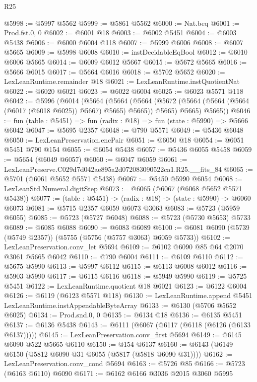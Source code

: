 \begin{lexlean}{R25}
\begin{coremodule}
@5998 := @5997 @5562
@5999 := @5861 @5562
@6000 := Nat.beq
@6001 := Prod.fst.{0, 0}
@6002 := @6001 @18
@6003 := @6002 @5451
@6004 := @6003 @5438
@6006 := @6000 @6004 @118
@6007 := @5999 @6006
@6008 := @6007 @5665
@6009 := @5998 @6008
@6010 := instDecidableEqBool
@6012 := @6010 @6006 @5665
@6014 := @6009 @6012 @5667
@6015 := @5672 @5665
@6016 := @5666 @6015
@6017 := @5664 @6016
@6018 := @5702 @5652
@6020 := LexLeanRuntime.remainder @18
@6021 := LexLeanRuntime.instQuotientNat
@6022 := @6020 @6021
@6023 := @6022 @6004
@6025 := @6023 @5571 @118
@6042 := @5996
    (@6014
      (@5664
        (@5664
          (@5664 (@5672 (@5664 (@5664 (@5664 (@6017 (@6018 @6025)) @5667) @5665) @5665)) @5665)
          @5665)
        @5665))
@6046 := fun (table : @5451) => fun (radix : @18) => fun (state : @5990) => @5666 @6042
@6047 := @5695 @2357
@6048 := @790 @5571
@6049 := @5436 @6048
@6050 := LexLeanPreservation.encPair
@6051 := @6050 @18
@6054 := @6051 @5451 @790 @154
@6055 := @6054 @5438
@6057 := @5436 @6055 @5458
@6059 := @5654 (@6049 @6057)
@6060 := @6047 @6059
@6061 := LexLeanPreserve.C029d7d042ae895a2d072083090522ca1.R25.__fits_84
@6065 := @5701 (@6061 @5652 @5571 @5438)
@6067 := @5450 @5990 @6054
@6068 := LexLeanStd.Numeral.digitStep
@6073 := @6065 (@6067 (@6068 @5652 @5571 @5438))
@6077 := (table : @5451) -> (radix : @18) -> (state : @5990) -> @6060 @6073
@6081 := @5715 @2357 @6059 @6073 @3063
@6083 := @5723 (@5959 @6055)
@6085 := @5723 (@5727 @6048)
@6088 := @5723 (@5730 @5653) @5733
@6089 := @6085 @6088
@6090 := @6083 @6089
@6100 := @6081 @6090 (@5739 (@5749 @2357)) (@5755 (@5756 (@5757 @3063) @6059 @5733))
@6102 := LexLeanPreservation.conv_let @5694
@6109 := @6102 @6090 @85 @64 @2070 @3061 @5665 @6042
@6110 := @790 @6004
@6111 := @6109 @6110
@6112 := @5675 @5990
@6113 := @5997 @6112
@6115 := @6113 @6008 @6012
@6116 := @5903 @5990
@6117 := @6115 @6116
@6118 := @5949 @5990
@6119 := @5725 @5451
@6122 := LexLeanRuntime.quotient @18 @6021
@6123 := @6122 @6004
@6126 := @6119 (@6123 @5571 @118)
@6130 := LexLeanRuntime.append @5451 LexLeanRuntime.instAppendableByteArray
@6133 := @6130 (@5706 @5652 @6025)
@6134 := Prod.snd.{0, 0}
@6135 := @6134 @18
@6136 := @6135 @5451
@6137 := @6136 @5438
@6143 := @6111 (@6067 (@6117 (@6118 (@6126 (@6133 @6137)))))
@6145 := LexLeanPreservation.conv_first @5694
@6149 := @6145 @6090 @522 @5665 @6110
@6150 := @154 @6137
@6160 := @6143 (@6149 @6150 (@5812 @6090 @31 @6055 (@5817 (@5818 @6090 @31))))
@6162 := LexLeanPreservation.conv_cond @5694
@6163 := @5726 @85
@6166 := @5723 (@6163 @6110) @6090
@6171 := @6162 @6166 @3036 @2015 @3060 @5995

\end{coremodule}
\end{lexlean}
